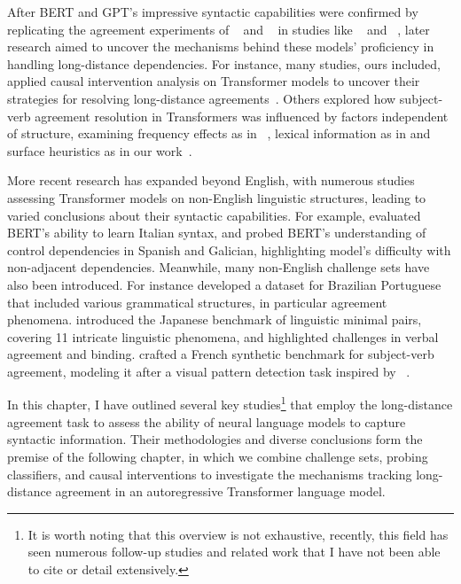 After BERT and GPT's impressive syntactic capabilities  were confirmed by replicating the agreement experiments of ~\cite{linzen-etal-2016-assessing} and ~\cite{gulordava-etal-2018-colorless} in studies like ~\cite{goldberg19assessing} and ~\cite{wolf2019some}, later research aimed to uncover the mechanisms behind these models' proficiency in handling long-distance dependencies. For instance, many studies, ours included, applied causal intervention analysis on Transformer models to uncover their strategies for resolving long-distance agreements~\citep{finlayson-etal-2021-causal,lasri-etal-2022-probing,li-etal-2022-distributed}. Others explored how subject-verb agreement resolution in Transformers was influenced by factors independent of structure, examining frequency effects as in ~\cite{wei-etal-2021-frequency}, lexical information as in \cite{lasri-etal-2022-bert} and surface heuristics as in our work~\cite{li-etal-2021-transformers}. 


More recent research has expanded beyond English, with numerous studies assessing Transformer models on non-English linguistic structures, leading to varied conclusions about their syntactic capabilities. For example, \cite{guarasci2023assessing} evaluated BERT's ability to learn Italian syntax, and \cite{de-dios-flores-etal-2023-dependency} probed BERT's understanding of control dependencies in Spanish and Galician, highlighting model's difficulty with non-adjacent dependencies. Meanwhile, many non-English challenge sets have also been introduced. For instance \cite{wilkens2023assessing} developed a dataset for Brazilian Portuguese that included various grammatical structures, in particular agreement phenomena. \cite{someya-oseki-2023-jblimp} introduced the Japanese benchmark of linguistic minimal pairs, covering 11 intricate linguistic phenomena, and highlighted challenges in verbal agreement and binding. \cite{an-etal-2023-blm} crafted a French synthetic benchmark for subject-verb agreement, modeling it after a visual pattern detection task inspired by ~\cite{raven1941standardization}.


In this chapter, I have outlined several key studies\footnote{It is worth noting that this overview is not exhaustive, recently, this field has seen numerous follow-up studies and related work that I have not been able to cite or detail extensively.} that employ the long-distance agreement task to assess the ability of neural language models to capture syntactic information. Their methodologies and diverse conclusions form the premise of the following chapter, in which we combine challenge sets, probing classifiers, and causal interventions to investigate the mechanisms tracking long-distance agreement in an autoregressive Transformer language model. 

